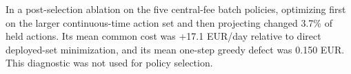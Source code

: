 In a post-selection ablation on the five central-fee batch policies, optimizing first on the larger continuous-time action set and then projecting changed 3.7\% of held actions. Its mean common cost was +17.1 EUR/day relative to direct deployed-set minimization, and its mean one-step greedy defect was 0.150 EUR. This diagnostic was not used for policy selection.